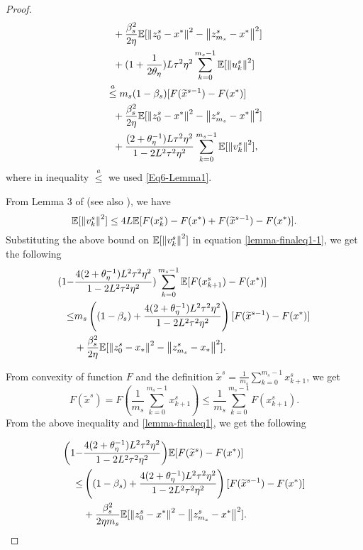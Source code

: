 \begin{proof}
\begin{equation}
\begin{split}
&~~+ {\frac{ \beta_s^2}{2\eta}}\mathbb{E}[\left\lVert z_{0}^s-x^*\right\rVert^2-\left\lVert z_{m_s}^s-x^*\right\rVert^2]\\
&~~+(1+\frac{1}{2\theta_{\eta}})L\tau^2\eta^2\sum_{k=0}^{m_s-1}\mathbb{E}[\left\lVert u_{k}^s\right\rVert^2]\\
&\stackrel{a}{\leq} m_s(1-\beta_s)[F(\widetilde{x}^{s-1})-F(x^*)] \\
&~~+ {\frac{ \beta_s^2}{2\eta}}\mathbb{E}[\left\lVert z_{0}^s-x^*\right\rVert^2-\left\lVert z_{m_s}^s-x^*\right\rVert^2]\\
&~~+\frac{(2+\theta_{\eta}^{-1})L\tau^2\eta^2}{1-2L^2 \tau^2\eta^2}\sum_{k=0}^{m_s-1}\mathbb{E}[\left\lVert v^s_k\right\rVert^2],
\end{split}
\end{equation}
where in inequality $\stackrel{a}{\leq}$ we used \eqref{Eq6-Lemma1}.


From Lemma 3 of \cite{Johnson12} (see also \cite{Reddi2015}), we have 
\[
\mathbb{E}[\left\lVert v^s_k\right\rVert^2] \leq 4L \mathbb{E}[F(x_k^s)-F(x^*)+F(\widetilde{x}^{s-1})-F(x^*)].
\]
Substituting the above bound on $\mathbb{E}[\left\lVert v^s_k\right\rVert^2]$ in equation \eqref{lemma-finaleq1-1}, we get the following
\begin{gather}\label{lemma-finaleq1}
\begin{split}
(1-&\frac{4(2+\theta_{\eta}^{-1})L^2\tau^2\eta^2}{1-2L^2 \tau^2\eta^2})\sum_{k=0}^{m_s-1}\E[F(x_{k+1}^s)-F(x^*)]\\ 
\leq &m_s\left((1-\beta_s)+\frac{4(2+\theta_{\eta}^{-1})L^2\tau^2\eta^2}{1-2L^2 \tau^2\eta^2}\right)[F(\widetilde{x}^{s-1})-F(x^*)] \\
&+ {\frac{ \beta_s^2}{2\eta}}\E[\norm{z_{0}^s-x_*}^2-\norm{z_{m_s}^s-x_*}^2].
\end{split}
\raisetag{15pt}
\end{gather}

From convexity of function $F$ and the definition $\widetilde{x}^s = \frac{1}{m_s}\sum_{k=0}^{m_s-1}x_{k+1}^s$, we get 
\[
F(\widetilde{x}^s) = F(\frac{1}{m_s}\sum_{k=0}^{m_s-1} x_{k+1}^s)\leq \frac{1}{m_s}\sum_{k=0}^{m_s-1}F(x_{k+1}^s).
\]
From the above inequality and \eqref{lemma-finaleq1}, we get the following

\begin{gather}
\begin{split}
\bigg(1-&\frac{4(2+\theta_{\eta}^{-1})L^2\tau^2\eta^2}{1-2L^2 \tau^2\eta^2}\bigg)\E[F(\widetilde{x}^s)-F(x^*)]\\ 
\leq &\left((1-\beta_s)+\frac{4(2+\theta_{\eta}^{-1})L^2\tau^2\eta^2}{1-2L^2 \tau^2\eta^2}\right)[F(\widetilde{x}^{s-1})-F(x^*)] \\
&+ {\frac{\beta_s^2}{2\eta m_s}}\E[\norm{z_{0}^s-x^*}^2-\norm{z_{m_s}^s-x^*}^2].
\end{split}
\raisetag{20pt}
\end{gather}
\end{proof}
